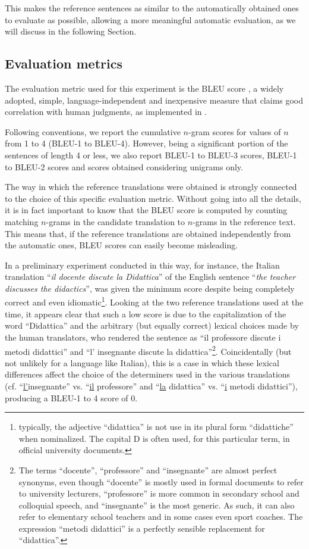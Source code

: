 This makes the reference sentences as similar to the automatically obtained ones to evaluate as possible, allowing a more meaningful automatic evaluation, as we will discuss in the following Section.

\subsection{Evaluation metrics} \label{bleu}
The evaluation metric used for this experiment is the BLEU score \cite{bleu}, a widely adopted, simple, language-independent and inexpensive measure that claims good correlation with human judgments, as implemented in \cite{thesisbleu}. \smallskip

Following conventions, we report the cumulative $n$-gram scores for values of $n$ from 1 to 4 (BLEU-1 to BLEU-4). However, being a significant portion of the sentences of length 4 or less, we also report BLEU-1 to BLEU-3 scores, BLEU-1 to BLEU-2 scores and scores obtained considering unigrams only. \smallskip

The way in which the reference translations were obtained is strongly connected to the choice of this specific evaluation metric.
Without going into all the details, it is in fact important to know that the BLEU score is computed by counting matching $n$-grams in the candidate translation to $n$-grams in the reference text. 
This means that, if the reference translations are obtained independently from the automatic ones, BLEU scores can easily become misleading. \smallskip

In a preliminary experiment conducted in this way, for instance, the Italian translation ``\textit{il docente discute la Didattica}'' of the English sentence ``\textit{the teacher discusses the didactics}'', was given the minimum score despite being completely correct and even idiomatic\footnote{typically, the adjective ``didattica'' is not use in its plural form ``didattiche'' when nominalized. The capital D is often used, for this particular term, in official university documents.}. 
Looking at the two reference translations used at the time, it appears clear that such a low score is due to the capitalization of the word ``Didattica'' and the arbitrary (but equally correct) lexical choices made by the human translators, who rendered the sentence as ``il professore discute i metodi didattici'' and ``l' insegnante discute la didattica''\footnote{The terms ``docente'', ``professore'' and ``insegnante'' are almost perfect synonyms, even though ``docente'' is mostly used in formal documents to refer to university lecturers, ``professore'' is more common in secondary school and colloquial speech, and ``insegnante'' is the most generic. As such, it can also refer to elementary school teachers and in some cases even sport coaches. The expression ``metodi didattici'' is a perfectly sensible replacement for ``didattica''.}. 
Coincidentally (but not unlikely for a language like Italian), this is a case in which these lexical differences affect the choice of the determiners used in the various translations (cf. ``\underline{l'}insegnante'' vs. ``\underline{il} professore'' and ``\underline{la} didattica'' vs. ``\underline{i} metodi didattici''), producing a BLEU-1 to 4 score of 0. \smallskip

